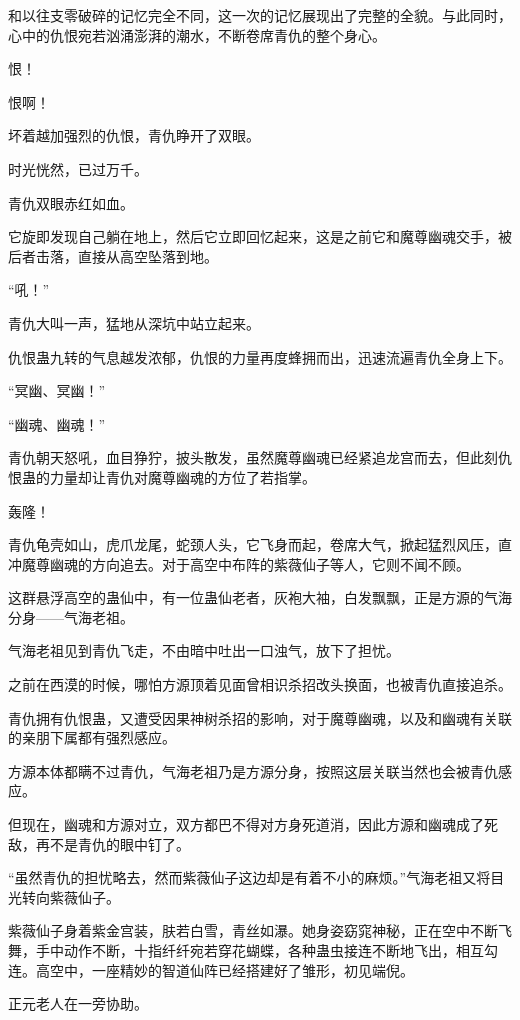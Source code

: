 \begin{this_body}
和以往支零破碎的记忆完全不同，这一次的记忆展现出了完整的全貌。与此同时，心中的仇恨宛若汹涌澎湃的潮水，不断卷席青仇的整个身心。

恨！

恨啊！

坏着越加强烈的仇恨，青仇睁开了双眼。

时光恍然，已过万千。

青仇双眼赤红如血。

它旋即发现自己躺在地上，然后它立即回忆起来，这是之前它和魔尊幽魂交手，被后者击落，直接从高空坠落到地。

“吼！”

青仇大叫一声，猛地从深坑中站立起来。

仇恨蛊九转的气息越发浓郁，仇恨的力量再度蜂拥而出，迅速流遍青仇全身上下。

“冥幽、冥幽！”

“幽魂、幽魂！”

青仇朝天怒吼，血目狰狞，披头散发，虽然魔尊幽魂已经紧追龙宫而去，但此刻仇恨蛊的力量却让青仇对魔尊幽魂的方位了若指掌。

轰隆！

青仇龟壳如山，虎爪龙尾，蛇颈人头，它飞身而起，卷席大气，掀起猛烈风压，直冲魔尊幽魂的方向追去。对于高空中布阵的紫薇仙子等人，它则不闻不顾。

这群悬浮高空的蛊仙中，有一位蛊仙老者，灰袍大袖，白发飘飘，正是方源的气海分身——气海老祖。

气海老祖见到青仇飞走，不由暗中吐出一口浊气，放下了担忧。

之前在西漠的时候，哪怕方源顶着见面曾相识杀招改头换面，也被青仇直接追杀。

青仇拥有仇恨蛊，又遭受因果神树杀招的影响，对于魔尊幽魂，以及和幽魂有关联的亲朋下属都有强烈感应。

方源本体都瞒不过青仇，气海老祖乃是方源分身，按照这层关联当然也会被青仇感应。

但现在，幽魂和方源对立，双方都巴不得对方身死道消，因此方源和幽魂成了死敌，再不是青仇的眼中钉了。

“虽然青仇的担忧略去，然而紫薇仙子这边却是有着不小的麻烦。”气海老祖又将目光转向紫薇仙子。

紫薇仙子身着紫金宫装，肤若白雪，青丝如瀑。她身姿窈窕神秘，正在空中不断飞舞，手中动作不断，十指纤纤宛若穿花蝴蝶，各种蛊虫接连不断地飞出，相互勾连。高空中，一座精妙的智道仙阵已经搭建好了雏形，初见端倪。

正元老人在一旁协助。


\end{this_body}
